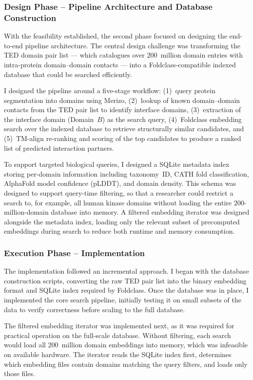 \subsubsection{Design Phase -- Pipeline Architecture and Database Construction}

With the feasibility established, the second phase focused on designing the end-to-end pipeline architecture.
The central design challenge was transforming the TED domain pair list --- which catalogues over 200~million domain entries with intra-protein domain--domain contacts --- into a Foldclass-compatible indexed database that could be searched efficiently.

I designed the pipeline around a five-stage workflow: (1)~query protein segmentation into domains using Merizo, (2)~lookup of known domain--domain contacts from the TED pair list to identify interface domains, (3)~extraction of the interface domain (Domain~$B$) as the search query, (4)~Foldclass embedding search over the indexed database to retrieve structurally similar candidates, and (5)~TM-align re-ranking and scoring of the top candidates to produce a ranked list of predicted interaction partners.

To support targeted biological queries, I designed a SQLite metadata index storing per-domain information including taxonomy~ID, CATH fold classification, AlphaFold model confidence (pLDDT), and domain density.
This schema was designed to support query-time filtering, so that a researcher could restrict a search to, for example, all human kinase domains without loading the entire 200-million-domain database into memory.
A filtered embedding iterator was designed alongside the metadata index, loading only the relevant subset of precomputed embeddings during search to reduce both runtime and memory consumption.

\subsubsection{Execution Phase -- Implementation}

The implementation followed an incremental approach.
I began with the database construction scripts, converting the raw TED pair list into the binary embedding format and SQLite index required by Foldclass.
Once the database was in place, I implemented the core search pipeline, initially testing it on small subsets of the data to verify correctness before scaling to the full database.

The filtered embedding iterator was implemented next, as it was required for practical operation on the full-scale database.
Without filtering, each search would load all 200~million domain embeddings into memory, which was infeasible on available hardware.
The iterator reads the SQLite index first, determines which embedding files contain domains matching the query filters, and loads only those files.

